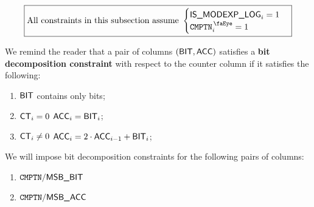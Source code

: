 \[
    \boxed{\text{All constraints in this subsection assume }
        \begin{cases}
            \isModexpLog     _{i} = 1 \\
            \isComputation _{i} = 1   \\
        \end{cases}}
\]

We remind the reader that a pair of columns $(\textsf{BIT}, \textsf{ACC})$ satisfies a
\textbf{bit decomposition constraint} with respect to the counter column \ct{} if it satisfies the following:
\begin{enumerate}
    \item $\textsf{BIT}$ contains only bits;
    \item \If $\textsf{CT}_{i} = 0$    \Then $\textsf{ACC}_{i} = \textsf{BIT}_{i}$;
    \item \If $\textsf{CT}_{i} \neq 0$ \Then $\textsf{ACC}_{i} = 2 \cdot \textsf{ACC}_{i - 1} + \textsf{BIT}_{i}$;
\end{enumerate}
We will impose bit decomposition constraints for the following pairs of columns:
\begin{multicols}{2}
    \begin{enumerate}
        \item $\texttt{CMPTN}\textsf{/}{\textsf{\textsf{MSB\_BIT}}}$
        \item $\texttt{CMPTN}\textsf{/}{\textsf{\textsf{MSB\_}\textsf{ACC}}}$
    \end{enumerate}
\end{multicols}

